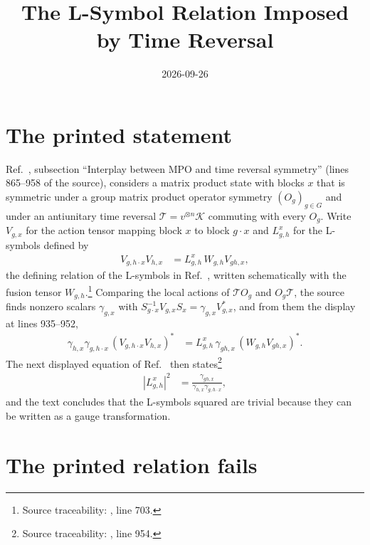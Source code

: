 \documentclass{article}
\title{The L-Symbol Relation Imposed by Time Reversal}
\author{}
\date{2026-09-26}
\begin{document}
\maketitle
{}

\section{The printed statement}

Ref.~\cite{GarreRubio2023MPOSym}, subsection ``Interplay between MPO and
time reversal symmetry'' (lines 865--958 of the source), considers a matrix
product state with blocks $x$ that is symmetric under a group matrix product
operator symmetry $(O_g)_{g\in G}$ and under an antiunitary time reversal
$\mathcal T=v^{\otimes n}\mathcal K$ commuting with every $O_g$. Write
$V_{g,x}$ for the action tensor mapping block $x$ to block $g\cdot x$ and
$L^x_{g,h}$ for the L-symbols defined by
\begin{align}
  V_{g,h\cdot x}V_{h,x} & =L^x_{g,h}\,W_{g,h}V_{gh,x},
  \label{eq:glm23_time_reversal_l_symbol_defining_relation}
\end{align}
the defining relation of the L-symbols in Ref.~\cite{GarreRubio2023MPOSym},
written schematically with the fusion tensor
$W_{g,h}$.\footnote{Source traceability:
, line 703.} Comparing the local actions of $\mathcal TO_g$ and
$O_g\mathcal T$, the source finds nonzero scalars $\gamma_{g,x}$ with
$S_{g\cdot x}^{-1}V_{g,x}S_x=\gamma_{g,x}V_{g,x}^*$, and from them the
display at lines 935--952,
\begin{align}
  \gamma_{h,x}\gamma_{g,h\cdot x}\,(V_{g,h\cdot x}V_{h,x})^*
   & =L^x_{g,h}\,\gamma_{gh,x}\,(W_{g,h}V_{gh,x})^*.
  \label{eq:glm23_time_reversal_l_symbol_time_reversal_display}
\end{align}
The next displayed equation of Ref.~\cite{GarreRubio2023MPOSym} then
states\footnote{Source traceability:
, line 954.}
\begin{align}
  |L^x_{g,h}|^2 & =\frac{\gamma_{gh,x}}{\gamma_{h,x}\gamma_{g,h\cdot x}},
  \label{eq:glm23_time_reversal_l_symbol_printed_modulus}
\end{align}
and the text concludes that the L-symbols squared are trivial because they
can be written as a gauge transformation.

\section{The printed relation fails}
\end{document}
